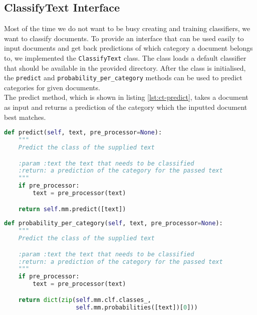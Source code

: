 \subsection{ClassifyText Interface}
Most of the time we do not want to be busy creating and training classifiers, we want to classify documents. To provide an interface that can be used easily to input documents and get back predictions of which category a document belongs to, we implemented the \texttt{ClassifyText} class. The class loads a default classifier that should be available in the provided directory. After the class is initialised, the \texttt{predict} and \texttt{probability\_per\_category} methods can be used to predict categories for given documents.\\

The predict method, which is shown in listing \ref{lst:ct-predict}, takes a document as input and returns a prediction of the category which the inputted document best matches.\\

\begin{lstlisting}[language=python, caption={Predict method of the ClassifyText class}, label={lst:ct-predict}]
def predict(self, text, pre_processor=None):
    """
    Predict the class of the supplied text

    :param :text the text that needs to be classified
    :return: a prediction of the category for the passed text
    """
    if pre_processor:
        text = pre_processor(text)

    return self.mm.predict([text])
\end{lstlisting}



\begin{lstlisting}[language=python, caption={probability\_per\_category method of the ClassifyText class}, label={lst:ct-prob}]
def probability_per_category(self, text, pre_processor=None):
    """
    Predict the class of the supplied text

    :param :text the text that needs to be classified
    :return: a prediction of the category for the passed text
    """
    if pre_processor:
        text = pre_processor(text)

    return dict(zip(self.mm.clf.classes_,
                    self.mm.probabilities([text])[0]))
\end{lstlisting}